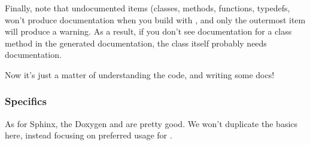 \documentclass[letterpaper,10pt,english]{sphinxmanual}
\renewcommand{\sphinxcode}[1]{\texttt{\small{#1}}}
\begin{document}
Finally, note that undocumented items (classes, methods, functions,
typedefs,  won’t produce documentation when you build with
\sphinxcode{}, and only the outermost item
will produce a warning.  As a result, if you don’t see documentation
for a class method in the generated documentation, the class itself
probably needs documentation.

Now it’s just a matter of understanding the code, and writing some
docs!


\subsubsection{ Specifics}
\label{\detokenize{documentation:id1}}
As for Sphinx, the Doxygen  and  are pretty good.
We won’t duplicate the basics here, instead focusing on preferred
usage for .
\end{document}
